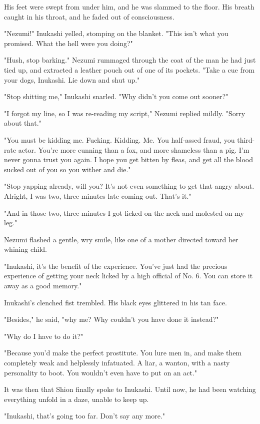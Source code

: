 His feet were swept from under him, and he was slammed to the floor. His
breath caught in his throat, and he faded out of consciousness.

\mybreak

"Nezumi!" Inukashi yelled, stomping on the blanket. "This isn't what you
promised. What the hell were you doing?"

"Hush, stop barking." Nezumi rummaged through the coat of the man he had
just tied up, and extracted a leather pouch out of one of its pockets.
"Take a cue from your dogs, Inukashi. Lie down and shut up."

"Stop shitting me," Inukashi snarled. "Why didn't you come out sooner?"

"I forgot my line, so I was re-reading my script," Nezumi replied
mildly. "Sorry about that."~

"You must be kidding me. Fucking. Kidding. Me. You half-assed fraud, you
third-rate actor. You're more cunning than a fox, and more shameless
than a pig. I'm never gonna trust you again. I hope you get bitten by
fleas, and get all the blood sucked out of you so you wither and die."

"Stop yapping already, will you? It's not even something to get that
angry about. Alright, I was two, three minutes late coming out. That's
it."

"And in those two, three minutes I got licked on the neck and molested
on my leg."

Nezumi flashed a gentle, wry smile, like one of a mother directed toward
her whining child.

"Inukashi, it's the benefit of the experience. You've just had the
precious experience of getting your neck licked by a high official of
No. 6. You can store it away as a good memory."

Inukashi's clenched fist trembled. His black eyes glittered in his tan
face.

"Besides," he said, "why me? Why couldn't you have done it instead?"

"Why do I have to do it?"

"Because you'd make the perfect prostitute. You lure men in, and make
them completely weak and helplessly infatuated. A liar, a wanton, with a
nasty personality to boot. You wouldn't even have to put on an act."

It was then that Shion finally spoke to Inukashi. Until now, he had been
watching everything unfold in a daze, unable to keep up.

"Inukashi, that's going too far. Don't say any more."

